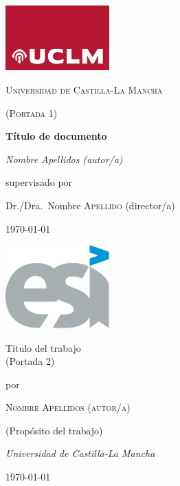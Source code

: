 \documentclass[12pt,a4paper]{report}
\begin{document}

\begin{titlepage}
	\centering
	\includegraphics[width=4cm]{./figs/uclm_logo}\par\vspace{1cm}
	{\scshape\LARGE Universidad de Castilla-La Mancha \par}
	\vspace{1cm}
	{\scshape\Large(Portada 1)\par} %
	\vspace{1.5cm}
	{\huge\bfseries Título de documento\par} %
	\vspace{2cm}
	{\Large\itshape Nombre Apellidos (autor/a)\par} %
	\vfill
	supervisado por\par
	Dr./Dra.~Nombre \textsc{Apellido} (director/a)
	\vfill %
	{\large \today \par}
\end{titlepage}
\restoregeometry

\begin{titlepage}
	\begin{addmargin}[4cm]{-1cm} %
		\centering
		\hfill\includegraphics[width=4cm]{./figs/esi_logo}\par
		\vspace{4\baselineskip}
		{\Huge 
		Título del trabajo\\ 
        (Portada 2)\par}
		\vspace{4\baselineskip}
		por\par\vspace{\baselineskip}
		{\Large\textsc{Nombre Apellidos (autor/a)}\par}
		\vfill  %
		(Propósito del trabajo)\par
		{\itshape Universidad de Castilla-La Mancha\par
        \today}
	\end{addmargin}
\end{titlepage}
\end{document}
